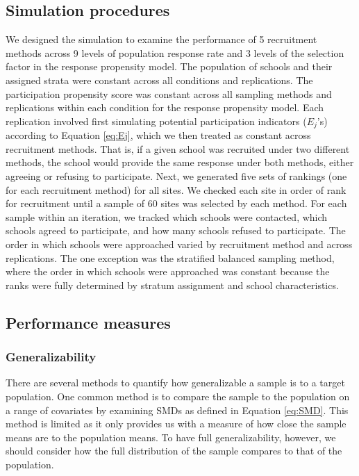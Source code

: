 \documentclass[
  english,
  man,floatsintext]{apa6}
\begin{document}
\hypertarget{simulation-procedures}{%
\subsection*{Simulation procedures}\label{simulation-procedures}}

We designed the simulation to examine the performance of 5 recruitment methods across 9 levels of population response rate and 3 levels of the selection factor in the response propensity model. The population of schools and their assigned strata were constant across all conditions and replications. The participation propensity score was constant across all sampling methods and replications within each condition for the response propensity model. Each replication involved first simulating potential participation indicators (\(E_j\)'s) according to Equation \eqref{eq:Ej}, which we then treated as constant across recruitment methods. That is, if a given school was recruited under two different methods, the school would provide the same response under both methods, either agreeing or refusing to participate. Next, we generated five sets of rankings (one for each recruitment method) for all sites.
We checked each site in order of rank for recruitment until a sample of 60 sites was selected by each method. For each sample within an iteration, we tracked which schools were contacted, which schools agreed to participate, and how many schools refused to participate.
The order in which schools were approached varied by recruitment method and across replications. The one exception was the stratified balanced sampling method, where the order in which schools were approached was constant because the ranks were fully determined by stratum assignment and school characteristics.

\hypertarget{performance-measures}{%
\subsection*{Performance measures}\label{performance-measures}}

\hypertarget{generalizability}{%
\subsubsection*{Generalizability}\label{generalizability}}

There are several methods to quantify how generalizable a sample is to a target population. One common method is to compare the sample to the population on a range of covariates by examining SMDs as defined in Equation \eqref{eq:SMD}. This method is limited as it only provides us with a measure of how close the sample means are to the population means.
To have full generalizability, however, we should consider how the full distribution of the sample compares to that of the population.
\end{document}
